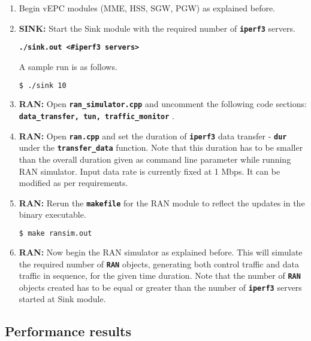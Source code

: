 \documentclass[hidelinks]{report}
\newcommand{\cf}[1] {
	\textbf{\texttt{#1}}
}
\begin{document}
\begin{enumerate}

\item Begin vEPC modules (MME, HSS, SGW, PGW) as explained before.

\item \textbf{SINK:} Start the Sink module with the required number of \cf{iperf3} servers.

\begin{center}

\cf{./sink.out <\#iperf3 servers>}

\end{center}

A sample run is as follows.

\begin{lstlisting}[language=bash]
$ ./sink 10
\end{lstlisting}

\item \textbf{RAN:} Open \cf{ran\_simulator.cpp} and uncomment the following code sections: \cf{data\_transfer, tun, traffic\_monitor}. 

\item \textbf{RAN:} Open \cf{ran.cpp} and set the duration of \cf{iperf3} data transfer - \cf{dur} under the \cf{transfer\_data} function. Note that this duration has to be smaller than the overall duration given as command line parameter while running RAN simulator. Input data rate is currently fixed at 1 Mbps. It can be modified as per requirements.

\item \textbf{RAN:} Rerun the \cf{makefile} for the RAN module to reflect the updates in the binary executable.

\begin{lstlisting}[language=bash]
$ make ransim.out
\end{lstlisting}

\item \textbf{RAN:} Now begin the RAN simulator as explained before. This will simulate the required number of \cf{RAN} objects, generating both control traffic and data traffic in sequence, for the given time duration. Note that the number of \cf{RAN} objects created has to be equal or greater than the number of \cf{iperf3} servers started at Sink module.

\end{enumerate}

\subsection*{Performance results}
\end{document}
